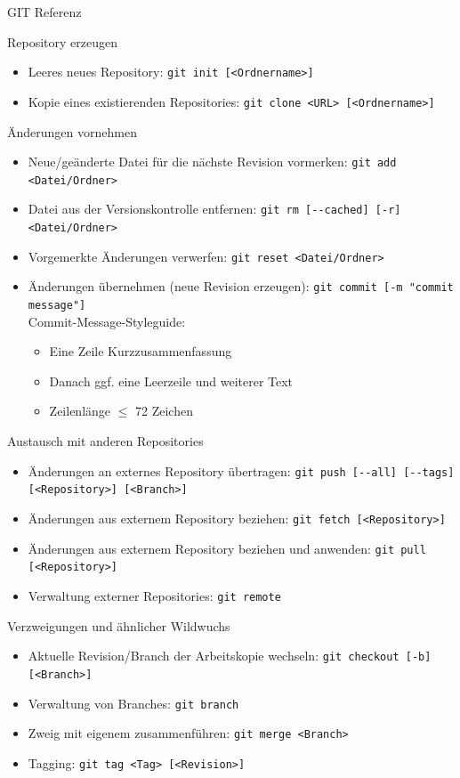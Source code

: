 \begin{frame}{GIT Referenz}
	\begin{block}{Repository erzeugen}
		\begin{itemize}
			\item Leeres neues Repository: \verb|git init [<Ordnername>]|
			\item Kopie eines existierenden Repositories: \verb|git clone <URL> [<Ordnername>]|
		\end{itemize}
	\end{block}
	\begin{block}{Änderungen vornehmen}
		\begin{itemize}
			\item Neue/geänderte Datei für die nächste Revision vormerken: \verb|git add <Datei/Ordner>|
			\item Datei aus der Versionskontrolle entfernen: \verb|git rm [--cached] [-r] <Datei/Ordner>|
			\item Vorgemerkte Änderungen verwerfen: \verb|git reset <Datei/Ordner>|
			\item Änderungen übernehmen (neue Revision erzeugen): \verb|git commit [-m "commit message"]| \\
				Commit-Message-Styleguide:
			\begin{itemize}
				\item Eine Zeile Kurzzusammenfassung
				\item Danach ggf. eine Leerzeile und weiterer Text
				\item Zeilenlänge $\le$ 72 Zeichen
			\end{itemize}
		\end{itemize}
	\end{block}
	\begin{block}{Austausch mit anderen Repositories}
		\begin{itemize}
			\item Änderungen an externes Repository übertragen: \verb|git push [--all] [--tags] [<Repository>] [<Branch>]|
			\item Änderungen aus externem Repository beziehen: \verb|git fetch [<Repository>]|
			\item Änderungen aus externem Repository beziehen und anwenden: \verb|git pull [<Repository>]|
			\item Verwaltung externer Repositories: \verb|git remote|
		\end{itemize}
	\end{block}
	\begin{block}{Verzweigungen und ähnlicher Wildwuchs}
		\begin{itemize}
			\item Aktuelle Revision/Branch der Arbeitskopie wechseln: \verb|git checkout [-b] [<Branch>]|
			\item Verwaltung von Branches: \verb|git branch|
			\item Zweig mit eigenem zusammenführen: \verb|git merge <Branch>|
			\item Tagging: \verb|git tag <Tag> [<Revision>]|
		\end{itemize}
	\end{block}
\end{frame}

